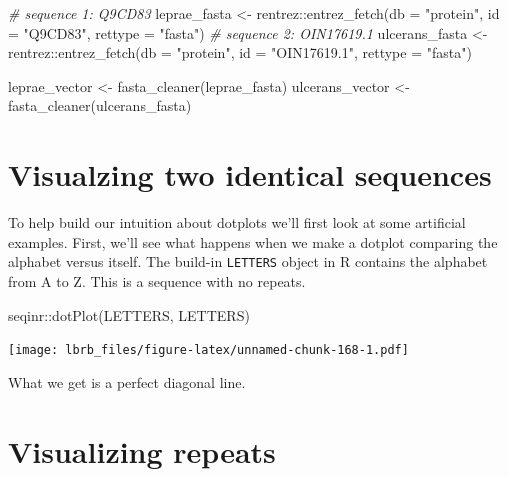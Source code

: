 \documentclass[
]{book}
\newenvironment{Shaded}{\begin{snugshade}}{\end{snugshade}}
\newcommand{\AttributeTok}[1]{\textcolor[rgb]{0.77,0.63,0.00}{#1}}
\newcommand{\CommentTok}[1]{\textcolor[rgb]{0.56,0.35,0.01}{\textit{#1}}}
\newcommand{\FunctionTok}[1]{\textcolor[rgb]{0.00,0.00,0.00}{#1}}
\newcommand{\NormalTok}[1]{#1}
\newcommand{\OtherTok}[1]{\textcolor[rgb]{0.56,0.35,0.01}{#1}}
\newcommand{\SpecialCharTok}[1]{\textcolor[rgb]{0.00,0.00,0.00}{#1}}
\newcommand{\StringTok}[1]{\textcolor[rgb]{0.31,0.60,0.02}{#1}}
\begin{document}
\begin{Shaded}
\begin{Highlighting}[]
\CommentTok{\# sequence 1: Q9CD83}
\NormalTok{leprae\_fasta }\OtherTok{\textless{}{-}}\NormalTok{ rentrez}\SpecialCharTok{::}\FunctionTok{entrez\_fetch}\NormalTok{(}\AttributeTok{db =} \StringTok{"protein"}\NormalTok{,}
                        \AttributeTok{id =} \StringTok{"Q9CD83"}\NormalTok{,}
                         \AttributeTok{rettype =} \StringTok{"fasta"}\NormalTok{)}
\CommentTok{\# sequence 2: OIN17619.1}
\NormalTok{ulcerans\_fasta }\OtherTok{\textless{}{-}}\NormalTok{ rentrez}\SpecialCharTok{::}\FunctionTok{entrez\_fetch}\NormalTok{(}\AttributeTok{db =} \StringTok{"protein"}\NormalTok{,}
                         \AttributeTok{id =} \StringTok{"OIN17619.1"}\NormalTok{,}
                         \AttributeTok{rettype =} \StringTok{"fasta"}\NormalTok{)}

\NormalTok{leprae\_vector   }\OtherTok{\textless{}{-}} \FunctionTok{fasta\_cleaner}\NormalTok{(leprae\_fasta)}
\NormalTok{ulcerans\_vector }\OtherTok{\textless{}{-}} \FunctionTok{fasta\_cleaner}\NormalTok{(ulcerans\_fasta)}
\end{Highlighting}
\end{Shaded}

\hypertarget{visualzing-two-identical-sequences}{%
\section{Visualzing two identical sequences}\label{visualzing-two-identical-sequences}}

To help build our intuition about dotplots we'll first look at some artificial examples. First, we'll see what happens when we make a dotplot comparing the alphabet versus itself. The build-in \texttt{LETTERS} object in R contains the alphabet from A to Z. This is a sequence with no repeats.

\begin{Shaded}
\begin{Highlighting}[]
\NormalTok{seqinr}\SpecialCharTok{::}\FunctionTok{dotPlot}\NormalTok{(LETTERS, }
\NormalTok{                LETTERS)}
\end{Highlighting}
\end{Shaded}

\texttt{[image: lbrb\_files/figure-latex/unnamed-chunk-168-1.pdf]}

What we get is a perfect diagonal line.

\hypertarget{visualizing-repeats}{%
\section{Visualizing repeats}\label{visualizing-repeats}}
\end{document}
